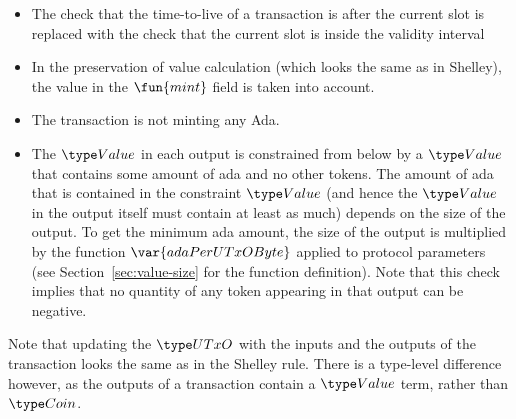 \begin{itemize}
  \item The check that the time-to-live of a transaction is after the current
  slot is replaced with the check that the current slot is inside the validity interval

  \item In the preservation of value calculation (which looks the same as in
  Shelley), the value in the $\fun{mint}$ field is taken into account.

  \item The transaction is not minting any Ada.

  \item The $\Value$ in each output is constrained from below by a
    $\Value$ that contains some amount of ada and no other tokens.
    The amount of ada that is contained in the constraint $\Value$ (and
    hence the $\Value$ in the output itself must contain at least as much) depends on the
    size of the output. To get the minimum ada amount, the size of the output is multiplied by
    the function $\var{adaPerUTxOByte}$ applied to protocol parameters
    (see Section~\ref{sec:value-size} for the function definition).
    Note that this check implies that no quantity of any token appearing in that output can be
    negative.
\end{itemize}

Note that updating the $\UTxO$ with the inputs and the outputs of the transaction
looks the same as in the Shelley rule. There is a type-level difference however, as
the outputs of a transaction contain a $\Value$ term, rather than
$\Coin$.


